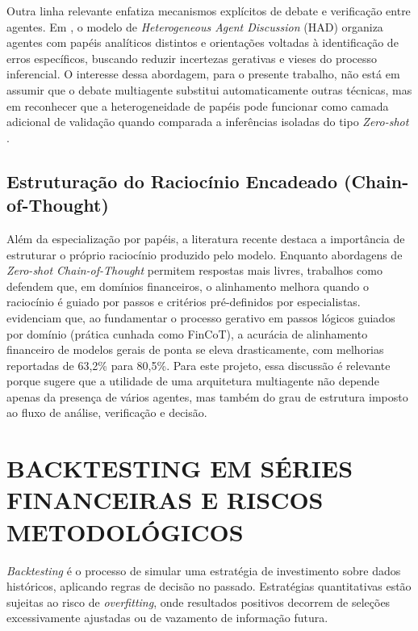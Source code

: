 \documentclass{eic-bcc-tcc}
\begin{document}
Outra linha relevante enfatiza mecanismos explícitos de debate e verificação entre agentes. Em \citet{Xing2024}, o modelo de \textit{Heterogeneous Agent Discussion} (HAD) organiza agentes com papéis analíticos distintos e orientações voltadas à identificação de erros específicos, buscando reduzir incertezas gerativas e vieses do processo inferencial. O interesse dessa abordagem, para o presente trabalho, não está em assumir que o debate multiagente substitui automaticamente outras técnicas, mas em reconhecer que a heterogeneidade de papéis pode funcionar como camada adicional de validação quando comparada a inferências isoladas do tipo \textit{Zero-shot} \citep[p. 5, p. 9]{Xing2024}.

\subsection{Estruturação do Raciocínio Encadeado (Chain-of-Thought)}

Além da especialização por papéis, a literatura recente destaca a importância de estruturar o próprio raciocínio produzido pelo modelo. Enquanto abordagens de \textit{Zero-shot Chain-of-Thought} permitem respostas mais livres, trabalhos como \citet{FinCoT2026} defendem que, em domínios financeiros, o alinhamento melhora quando o raciocínio é guiado por passos e critérios pré-definidos por especialistas. \citet[p. 1]{FinCoT2026} evidenciam que, ao fundamentar o processo gerativo em passos lógicos guiados por domínio (prática cunhada como FinCoT), a acurácia de alinhamento financeiro de modelos gerais de ponta se eleva drasticamente, com melhorias reportadas de 63,2\% para 80,5\%. Para este projeto, essa discussão é relevante porque sugere que a utilidade de uma arquitetura multiagente não depende apenas da presença de vários agentes, mas também do grau de estrutura imposto ao fluxo de análise, verificação e decisão.

\section{BACKTESTING EM SÉRIES FINANCEIRAS E RISCOS METODOLÓGICOS}

\textit{Backtesting} é o processo de simular uma estratégia de investimento sobre dados históricos, aplicando regras de decisão no passado. Estratégias quantitativas estão sujeitas ao risco de \textit{overfitting}, onde resultados positivos decorrem de seleções excessivamente ajustadas ou de vazamento de informação futura.
\end{document}
